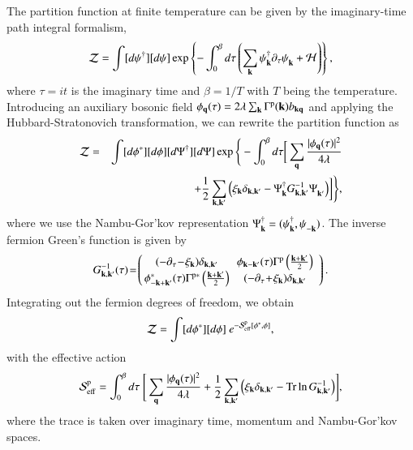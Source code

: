 \documentclass[aps,prd,amsmath,two column,nofootinbib,amssymb,referee]{revtex4}
\begin{document}
The partition function at finite temperature can be given by the imaginary-time path integral formalism, 
\begin{eqnarray}
{\cal Z}=\int [d{\psi^\dagger}][d{\psi}]\exp\left\{-\int_0^\beta d\tau\left(\sum_{{\bf k}}\psi_{{\bf k}}^\dagger\partial_\tau\psi_{{\bf k}}^{\phantom{\dag}}+{\cal H}\right)\right\},
\end{eqnarray}
where $\tau=it$ is the imaginary time and $\beta=1/T$ with $T$ being the temperature.  Introducing an auxiliary bosonic field $\phi_{\bf q}(\tau)=2\lambda\sum_{{\bf k}}\Gamma^{\rm p}({\bf k})b_{{\bf kq}}$ and applying the Hubbard-Stratonovich transformation, we can rewrite the partition function as
\begin{eqnarray}\label{bosonization}
{\cal Z}&=&\int [d{\phi^*}][d{\phi}][d{\Psi^\dagger}][d{\Psi}]\exp\Bigg\{-\int_0^\beta d\tau\bigg[\sum_{\bf q}{|\phi_{\bf q}(\tau)|^2\over4\lambda}\nonumber\\
&&+{1\over2}\sum_{{\bf k,k'}}\Big(\xi_{\bf k}\delta_{\bf k,k'}-\Psi_{{\bf k}}^\dagger G^{-1}_{\bf k,k'}\Psi_{{\bf k'}}^{\phantom{\dag}}\Big)\bigg]\Bigg\},
\end{eqnarray}
where we use the Nambu-Gor'kov representation $\Psi_{{\bf k}}^\dagger=(\psi_{{\bf k}}^\dagger,\psi_{-{\bf k}}^{\phantom{\dag}})$. The inverse fermion Green's function is given by
\begin{eqnarray}
G^{-1}_{\bf k,k'}(\tau)
\!=\!\left(\begin{array}{cc}
\!\!(-\partial_\tau\!-\!\xi_{{\bf k}})\delta_{\bf k,k'}&\!\!\phi_{\bf k-k'}(\tau)\Gamma^{\rm p}\left({{\bf k}+{\bf k'}\over2}\right)\\
\!\!\phi_{\bf -k+k'}^*(\tau)\Gamma^{{\rm p}*}\left({{\bf k}+{\bf k'}\over2}\right)&\!\!(-\partial_\tau\!+\!\xi_{{\bf k}})\delta_{\bf k,k'}
\end{array}\right).
\end{eqnarray}
Integrating out the fermion degrees of freedom, we obtain
\begin{eqnarray}
{\cal Z}=\int [d{\phi^*}][d{\phi}]~e^{-{\cal S}_{\rm eff}^{\rm p}[\phi^*,\phi]},
\end{eqnarray}
with the effective action
\begin{eqnarray}
{\cal S}_{\rm eff}^{\rm p}=\int_0^\beta d\tau \ \Bigg[\sum_{\bf q}{|\phi_{\bf q}(\tau)|^2\over4\lambda}+{1\over2}\sum_{{\bf k,k'}}\Big(\xi_{\bf k}\delta_{\bf k,k'}-\text{Tr}\ln G^{-1}_{\bf k,k'}\Big)\Bigg],
\end{eqnarray}
where the trace is taken over imaginary time, momentum and Nambu-Gor'kov spaces.
\end{document}
